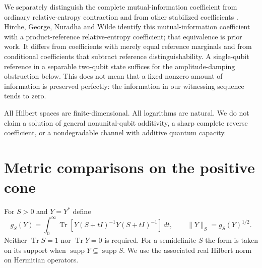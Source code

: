 \documentclass[11pt,a4paper]{article}
\theoremstyle{remark}\newtheorem{remark}[theorem]{Remark}
\newcommand{\Tr}{\operatorname{Tr}}
\newcommand{\supp}{\operatorname{supp}}
\begin{document}
We separately distinguish the complete mutual-information coefficient from
ordinary relative-entropy contraction and from other stabilized coefficients
\cite{hirche,bgsw}. Hirche, George, Nuradha and Wilde \cite{conditional} identify this
mutual-information coefficient with a product-reference relative-entropy
coefficient; that equivalence is prior work. It differs from coefficients
with merely equal reference marginals and from conditional coefficients
that subtract reference distinguishability.
A single-qubit reference in a separable two-qubit state suffices for the
amplitude-damping obstruction below. This does not mean that a fixed
nonzero amount of information is preserved perfectly: the information in
our witnessing sequence tends to zero.

All Hilbert spaces are finite-dimensional. All logarithms are natural.
We do not claim a solution of general nonunital-qubit additivity, a sharp
complete reverse coefficient, or a nondegradable channel with additive
quantum capacity.

\section{Metric comparisons on the positive cone}
For $S>0$ and $Y=Y^*$ define
\begin{equation}
 g_S(Y)=\int_0^\infty
 \Tr\!\left[Y(S+tI)^{-1}Y(S+tI)^{-1}\right]\,dt,
 \qquad \|Y\|_S=g_S(Y)^{1/2}.
 \label{eq:bkm}
\end{equation}
Neither $\Tr S=1$ nor $\Tr Y=0$ is required. For a semidefinite $S$ the
form is taken on its support when $\supp Y\subseteq\supp S$.
We use the associated real Hilbert norm on Hermitian operators.
\end{document}

